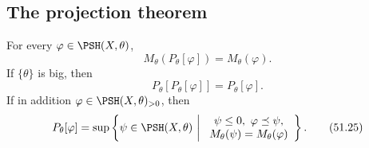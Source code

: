 \subsection{The projection theorem}
\label{sec:ch51-p-projection}

\begin{theorem}\label{thm:complex-p-projection}
For every $\varphi\in\PSH(X,\theta)$,
\[
 M_\theta(P_\theta[\varphi])=M_\theta(\varphi).
\tag{51.23}\label{eq:complex-p-projection}
\]
If $\{\theta\}$ is big, then
\[
 P_\theta[P_\theta[\varphi]]=P_\theta[\varphi].
\tag{51.24}\label{eq:complex-p-idempotence}
\]
If in addition $\varphi\in\PSH(X,\theta)_{>0}$, then
\[
 P_\theta[\varphi]
 =\sup\left\{\psi\in\PSH(X,\theta)\ \middle|\
 \begin{array}{c}
 \psi\leq0,\ \varphi\preceq\psi,\\
 M_\theta(\psi)=M_\theta(\varphi)
 \end{array}\right\}.
\tag{51.25}\label{eq:complex-p-characterization}
\]
\end{theorem}

